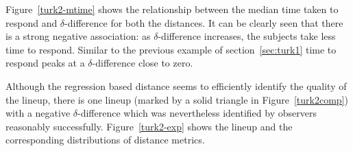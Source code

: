 \documentclass[12pt]{article}\usepackage[]{graphicx}\usepackage[]{color}
\begin{document}
Figure~\ref{turk2-mtime} shows the relationship between the median time taken to respond and $\delta$-difference for both the distances. It can be clearly seen that there is a strong negative association: as $\delta$-difference increases, the subjects take less time to respond. Similar to the previous example of section~\ref{sec:turk1} time to respond peaks at a $\delta$-difference close to zero.

Although the regression based distance seems to efficiently identify the quality of the lineup, there is one lineup (marked by a solid triangle in Figure~\ref{turk2comp}) with a negative $\delta$-difference which was nevertheless identified by observers reasonably successfully.  Figure~\ref{turk2-exp} shows the lineup and the corresponding distributions of distance metrics. 
\end{document}

